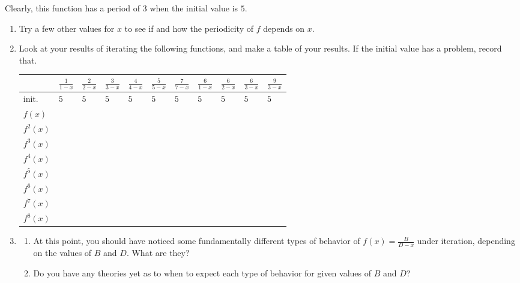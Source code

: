 \documentclass[../gatm.tex]{subfiles}
\begin{document}
Clearly, this function has a period of $3$ when the initial value is $5$.
\begin{enumerate}
\setcounter{enumi}{\value{problem_i}}
\item Try a few other values for $x$ to see if and how the periodicity of $f$ depends on $x$.
\item Look at your results of iterating the following functions, and make a table of your results. If the initial value has a problem, record that.
\begin{center}
\renewcommand*{\arraystretch}{1.4}
\begin{tabular}{|l|l|l|l|l|l|l|l|l|l|l|}
\hline
         & $\frac{1}{1-x}$ & $\frac{2}{2-x}$ & $\frac{3}{3-x}$ & $\frac{4}{4-x}$ & $\frac{5}{5-x}$ & $\frac{7}{7-x}$ & $\frac{6}{1-x}$ & $\frac{6}{2-x}$ & $\frac{6}{3-x}$ & $\frac{9}{3-x}$ \\ \hline
init.    & $5$   & $5$   & $5$ & $5$ & $5$ & $5$ & $5$ & $5$ & $5$ & $5$ \\ \hline
$f(x)$   &       &       &   &   &   &   &   &   &   &   \\ \hline
$f^2(x)$ &       &       &   &   &   &   &   &   &   &   \\ \hline
$f^3(x)$ &       &       &   &   &   &   &   &   &   &   \\ \hline
$f^4(x)$ &       &       &   &   &   &   &   &   &   &   \\ \hline
$f^5(x)$ &       &       &   &   &   &   &   &   &   &   \\ \hline
$f^6(x)$ &       &       &   &   &   &   &   &   &   &   \\ \hline
$f^7(x)$ &       &       &   &   &   &   &   &   &   &   \\ \hline
$f^8(x)$ &       &       &   &   &   &   &   &   &   &   \\ \hline
\end{tabular}
\end{center}
\item \begin{enumerate}
\item At this point, you should have noticed some fundamentally different types of behavior of $f(x)=\frac{B}{D-x}$ under iteration, depending on the values of $B$ and $D$. What are they?
\item Do you have any theories yet as to when to expect each type of behavior for given values of $B$ and $D$?
\end{enumerate}
\setcounter{problem_i}{\value{enumi}}
\end{enumerate}
\end{document}
